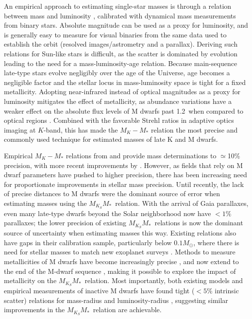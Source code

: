 \documentclass[twocolumn]{aastex62}
\newcommand{\mmk}{$M_{K_S}$\textendash$M_*$}
\begin{document}
An empirical approach to estimating single-star masses is through a relation between mass and luminosity \citep[e.g.,][]{Hen1993, Delfosse2000}, calibrated with dynamical mass measurements from binary stars. Absolute magnitude can be used as a proxy for luminosity, and is generally easy to measure for visual binaries from the same data used to establish the orbit (resolved images/astrometry and a parallax). Deriving such relations for Sun-like stars is difficult, as the scatter is dominated by evolution \citep[e.g.,][]{1991A&ARv...3...91A,2010A&ARv..18...67T} leading to the need for a mass-luminosity-age relation. Because main-sequence late-type stars evolve negligibly over the age of the Universe, age becomes a negligible factor and the stellar locus in mass-luminosity space is tight for a fixed metallicity. Adopting near-infrared instead of optical magnitudes as a proxy for luminosity mitigates the effect of metallicity, as abundance variations have a weaker effect on the absolute flux levels of M dwarfs past 1.2\um\ when compared to optical regions \citep{Delfosse2000,Bonfils:2005}. Combined with the favorable Strehl ratios in adaptive optics imaging at $K$-band, this has made the $M_K-M_*$ relation the most precise and commonly used technique for estimated masses of late K and M dwarfs. 

Empirical $M_K-M_*$ relations from \citet{Hen1993} and \citet{Delfosse2000} provide mass determinations to $\simeq$10\% precision, with more recent improvements by \citet{Benedict2016}. However, as fields that rely on M dwarf parameters have pushed to higher precision, there has been increasing need for proportionate improvements in stellar mass precision. Until recently, the lack of precise distances to M dwarfs were the dominant source of error when estimating masses using the \mmk\ relation. With the arrival of Gaia parallaxes, even many late-type dwarfs beyond the Solar neighborhood now have $<1\%$ parallaxes; the lower precision of existing \mmk\ relations is now the dominant source of uncertainty when estimating masses this way. Existing relations also have gaps in their calibration sample, particularly below $0.1M_\odot$, where there is need for stellar masses to match new exoplanet surveys \citep[e.g.,][]{Gillon2017}. Methods to measure metallicities of M dwarfs have become increasingly precise \citep[e.g.,][]{RojasAyala:2010, 2014A&A...568A.121N}, and now extend to the end of the M-dwarf sequence \citep{Mann2014}, making it possible to explore the impact of metallicity on the \mmk\ relation. Most importantly, both existing models and empirical measurements of inactive M dwarfs have found tight ($<5$\% intrinsic scatter) relations for mass-radius \citep[e.g.,][]{Bayless2006,Spada2013,2017AJ....154..100H} and luminosity-radius \citep[e.g.,][]{Boyajian2012,2015ApJ...802L..10T,Mann2015b}, suggesting similar improvements in the \mmk\ relation are achievable. 
\end{document}
